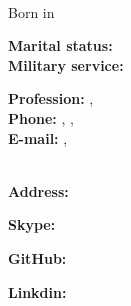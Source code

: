 \documentclass{./../lib/curriculumVitae}
\begin{document}
\iftoggle{Dev}{\par}{}
\noindent\parbox{56mm}
{\parbox{56mm}{\raggedright\Huge\bfseries\color{cyan}\fullName}\\\parbox{56mm}{\centering Born in \bornData}}\quad\parbox{38mm}
{\textbf{Marital status:} \maritalStatus\\\textbf{Military service:} \militaryService}\quad\parbox{90mm}
{\textbf{Profession:} \ProfessionI, \ProfessionII\\\textbf{Phone:} \mobilePhoneI, \mobilePhoneII, \phoneNumber\\\textbf{E-mail:} \emailI, \emailII}\\
\textbf{Address:} \fullAddress\\
\parbox{44mm}{\textbf{Skype:} \skype}\quad\parbox{70mm}{\textbf{GitHub:} \gitHub}\quad\parbox{70mm}{\textbf{Linkdin:} \linkedin}

\descriptions

\education

\workExperience

\teaching

\project

\publication

\LicensesCertifications

\honorsAwards

\training

\languageS

\craft

\voluntary
\end{document}
